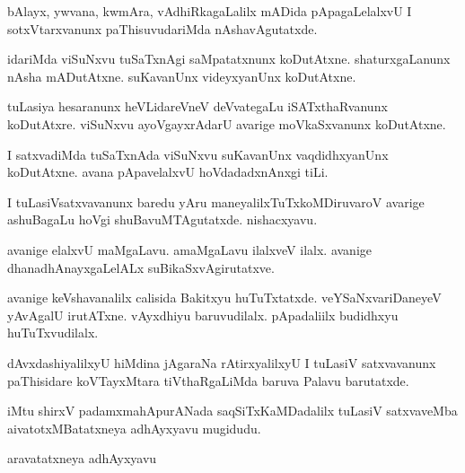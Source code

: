 \documentclass{article}
\begin{document}
\begin{mng}%
bAlayx, ywvana, kwmAra, vAdhiRkagaLalilx mADida pApagaLelalxvU I sotxVtarxvanunx paThisuvudariMda nAshavAgutatxde.
\end{mng}

\begin{mng}%
idariMda viSuNxvu tuSaTxnAgi saMpatatxnunx koDutAtxne. shaturxgaLanunx nAsha mADutAtxne. suKavanUnx videyxyanUnx koDutAtxne.
\end{mng}

\begin{mng}%
tuLasiya hesaranunx heVLidareVneV deVvategaLu iSATxthaRvanunx koDutAtxre. viSuNxvu ayoVgayxrAdarU avarige moVkaSxvanunx koDutAtxne.
\end{mng}

\begin{mng}%
I satxvadiMda tuSaTxnAda viSuNxvu suKavanUnx vaqdidhxyanUnx koDutAtxne. avana pApavelalxvU hoVdadadxnAnxgi tiLi.
\end{mng}

\begin{mng}%
I tuLasiVsatxvavanunx baredu yAru maneyalilxTuTxkoMDiruvaroV avarige ashuBagaLu hoVgi shuBavuMTAgutatxde. nishacxyavu.
\end{mng}

\begin{mng}%
avanige elalxvU maMgaLavu. amaMgaLavu ilalxveV ilalx. avanige dhanadhAnayxgaLelALx suBikaSxvAgirutatxve.
\end{mng}

\begin{mng}%
avanige keVshavanalilx calisida Bakitxyu huTuTxtatxde. veYSaNxvariDaneyeV yAvAgalU irutATxne. vAyxdhiyu baruvudilalx. pApadaliilx budidhxyu huTuTxvudilalx.
\end{mng}

\begin{mng}%
dAvxdashiyalilxyU hiMdina jAgaraNa rAtirxyalilxyU I tuLasiV satxvavanunx paThisidare koVTayxMtara tiVthaRgaLiMda baruva Palavu barutatxde.
\end{mng}

\begin{center}
iMtu shirxV padamxmahApurANada saqSiTxKaMDadalilx tuLasiV satxvaveMba\\
aivatotxMBatatxneya adhAyxyavu mugidudu.
\end{center}

\begin{center}
{\textbf\large{aravatatxneya adhAyxyavu}}
\end{center}
\end{document}
